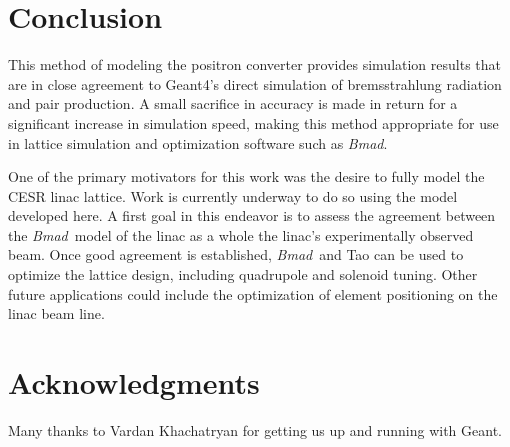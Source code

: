 \documentclass[letter,
               biblatex,     %
               keeplastbox,   %
               ]{jacow}
\newcommand{\bmad}{\textit{Bmad}\xspace}
\begin{document}
\section{Conclusion}

This method of modeling the positron converter provides simulation results that are in close agreement to Geant4's direct simulation of bremsstrahlung radiation and pair production.
A small sacrifice in accuracy is made in return for a significant increase in simulation speed, making this method appropriate for use in lattice simulation and optimization software such as \bmad.

One of the primary motivators for this work was the desire to fully model the CESR linac lattice.
Work is currently underway to do so using the model developed here.
A first goal in this endeavor is to assess the agreement between the \bmad\,  model of the linac as a whole the linac's experimentally observed beam.
Once good agreement is established, \bmad \, and Tao can be used to optimize the lattice design, including quadrupole and solenoid tuning.
Other future applications could include the optimization of element positioning on the linac beam line.



\section{Acknowledgments}

Many thanks to Vardan Khachatryan for getting us up and running with Geant.


\printbibliography

\clearpage
\end{document}
